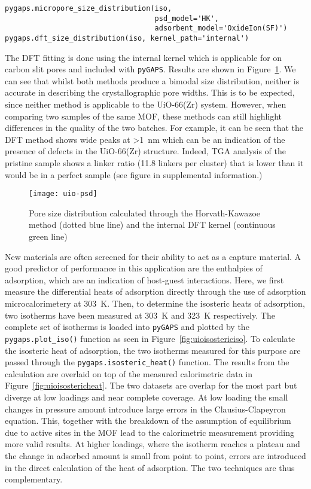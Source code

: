 \begin{lstlisting}[caption={Calculating the PSD},label={lst:PSD}]
pygaps.micropore_size_distribution(iso, 
                                   psd_model='HK', 
                                   adsorbent_model='OxideIon(SF)')
pygaps.dft_size_distribution(iso, kernel_path='internal')
\end{lstlisting}

The DFT fitting is done using the internal kernel
which is applicable for  on carbon slit pores and included with \texttt{pyGAPS}. 
Results are shown in Figure~\ref{fig:uiopsd}. We can see that whilst both methods
produce a bimodal size distribution, neither is accurate in describing the crystallographic pore
widths. This is to be expected, since neither method is applicable to the UiO-66(Zr)
system. However, when comparing two samples of the same MOF, these methods can still
highlight differences in the quality of the two batches. For example, it can be seen
that the DFT method shows wide peaks at >\SI{1}{\nano\meter}
which can be an indication of the presence of defects in the UiO-66(Zr) structure.
Indeed, TGA analysis of the pristine sample shows a linker ratio (11.8 linkers per cluster)
that is lower than it would be in a perfect sample (see figure in supplemental information.) 

\begin{figure}[ht]
    \texttt{[image: uio-psd]}
    \caption{Pore size distribution calculated through the Horvath-Kawazoe method (dotted 
    blue line) and the internal DFT kernel (continuous green line)}%
    \label{fig:uiopsd}
\end{figure}

New materials are often screened for their ability to act as a  capture material. 
A good predictor of performance 
in this application are the enthalpies of adsorption, which are an indication of
host-guest interactions. Here, we first measure the differential heats of adsorption
directly through the use of adsorption microcalorimetery at \SI{303}{\kelvin}. 
Then, to determine the isosteric heats of adsorption,
two isotherms have been measured at \SI{303}{\kelvin} and \SI{323}{\kelvin} respectively. 
The complete set of isotherms is loaded into \texttt{pyGAPS} and plotted by the 
\lstinline{pygaps.plot_iso()} function as seen in Figure~\ref{fig:uioisostericiso}. 
To calculate the isosteric heat
of adsorption, the two isotherms measured for this purpose are passed through the 
\lstinline{pygaps.isosteric_heat()} function. The results from the calculation are overlaid 
on top of the measured calorimetric data in 
Figure~\ref{fig:uioisostericheat}. The two datasets are
overlap for the most part but diverge at low loadings and near complete coverage.
At low loading the small changes in pressure amount introduce large errors in the 
Clausius-Clapeyron equation. This, together with the breakdown of the 
assumption of equilibrium due to active sites in the MOF lead to the calorimetric
measurement providing more valid results. At higher loadings, where the isotherm reaches
a plateau and the change in adsorbed amount is small from point to point, errors are
introduced in the direct calculation of the heat of adsorption. The two techniques are thus 
complementary.  

